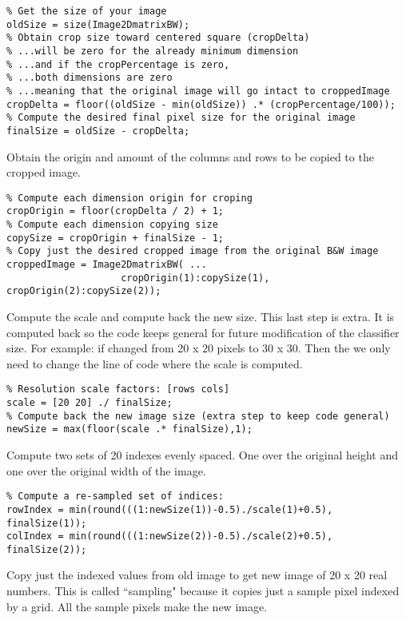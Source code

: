 \begin{verbatim}
% Get the size of your image
oldSize = size(Image2DmatrixBW);
% Obtain crop size toward centered square (cropDelta)
% ...will be zero for the already minimum dimension
% ...and if the cropPercentage is zero, 
% ...both dimensions are zero
% ...meaning that the original image will go intact to croppedImage
cropDelta = floor((oldSize - min(oldSize)) .* (cropPercentage/100));
% Compute the desired final pixel size for the original image
finalSize = oldSize - cropDelta;
\end{verbatim}

Obtain the origin and amount of the columns and rows to be copied to the cropped image.
\begin{verbatim}
% Compute each dimension origin for croping
cropOrigin = floor(cropDelta / 2) + 1;
% Compute each dimension copying size
copySize = cropOrigin + finalSize - 1;
% Copy just the desired cropped image from the original B&W image
croppedImage = Image2DmatrixBW( ...
                    cropOrigin(1):copySize(1), cropOrigin(2):copySize(2));
\end{verbatim}
Compute the scale and compute back the new size. This last step is extra. It is computed back so the code keeps general for future modification of the classifier size. For example: if changed from 20 x 20 pixels to 30 x 30. Then the we only need to change the line of code where the scale is computed.
\begin{verbatim}
% Resolution scale factors: [rows cols]
scale = [20 20] ./ finalSize;
% Compute back the new image size (extra step to keep code general)
newSize = max(floor(scale .* finalSize),1); 
\end{verbatim}
Compute two sets of 20 indexes evenly spaced. One over the original height and one over the original width of the image.

\begin{verbatim}
% Compute a re-sampled set of indices:
rowIndex = min(round(((1:newSize(1))-0.5)./scale(1)+0.5), finalSize(1));
colIndex = min(round(((1:newSize(2))-0.5)./scale(2)+0.5), finalSize(2));
\end{verbatim}
Copy just the indexed values from old image to get new image of 20 x 20 real numbers. This is called ``sampling" because it copies just a sample pixel indexed by a grid. All the sample pixels make the new image.

